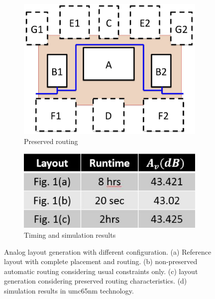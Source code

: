 \begin{figure}
\begin{subfigure}[t]{0.4\textwidth}
    \includegraphics[width=\textwidth]{Fig/RoutingPreserv_c.eps}
    \caption{Preserved routing}
    \label{fig:RoutingPreserv_C}
    \end{subfigure}
    \begin{subfigure}[t]{0.4\textwidth}
    \includegraphics[width=\textwidth]{Fig/RoutingPreserv_d.eps}
    \caption{Timing and simulation results}
    \label{fig:RoutingPreserv_d}
    \end{subfigure}
    \caption{Analog layout generation with different configuration. (a) Reference layout with complete placement and routing. (b) non-preserved automatic routing considering usual constraints only. (c) layout generation considering preserved routing characteristics. (d) simulation results in umc65nm technology.}
    \label{fig:RoutingPreserv}
  \end{figure}


